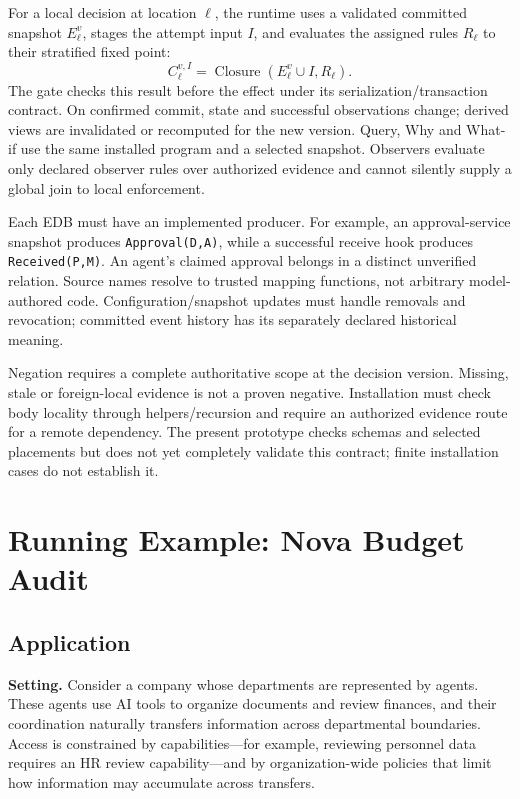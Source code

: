\documentclass[10pt]{article}
\begin{document}
For a local decision at location $\ell$, the runtime uses a validated committed
snapshot $E_\ell^v$, stages the attempt input $I$, and evaluates the assigned rules
$R_\ell$ to their stratified fixed point:
\[
C_\ell^{v,I}=\operatorname{Closure}(E_\ell^v\cup I,R_\ell).
\]
The gate checks this result before the effect under its serialization/transaction
contract. On confirmed commit, state and successful observations change; derived
views are invalidated or recomputed for the new version. Query, Why and What-if use
the same installed program and a selected snapshot. Observers evaluate only declared
observer rules over authorized evidence and cannot silently supply a global join to
local enforcement.

Each EDB must have an implemented producer. For example, an approval-service snapshot
produces \texttt{Approval(D,A)}, while a successful receive hook produces
\texttt{Received(P,M)}. An agent's claimed approval belongs in a distinct
unverified relation. Source names resolve to trusted mapping functions, not arbitrary
model-authored code. Configuration/snapshot updates must handle removals and revocation;
committed event history has its separately declared historical meaning.

Negation requires a complete authoritative scope at the decision version. Missing,
stale or foreign-local evidence is not a proven negative. Installation must check body
locality through helpers/recursion and require an authorized evidence route for a remote
dependency. The present prototype checks schemas and selected placements but does not
yet completely validate this contract; finite installation cases do not establish it.

\section{Running Example: Nova Budget Audit}

\subsection{Application}

\textbf{Setting.} Consider a company whose departments are represented by agents. These
agents use AI tools to organize documents and review finances, and their coordination
naturally transfers information across departmental boundaries. Access is constrained by
capabilities---for example, reviewing personnel data requires an HR review
capability---and by organization-wide policies that limit how information may accumulate
across transfers.
\end{document}
